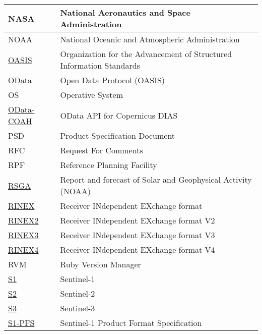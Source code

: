 \documentclass[dec_sum_main.tex]{subfiles}
\begin{document}
\begin{longtable}{|m{2.8cm}|m{10cm}|}
	NASA & National Aeronautics and Space Administration \\ \hline
	NOAA & National Oceanic and Atmospheric Administration \\ \hline
	\href{https://www.oasis-open.org/}{OASIS} & Organization for the Advancement of Structured Information Standards \\ \hline
	\href{https://www.odata.org/documentation/}{OData} & Open Data Protocol (OASIS) \\ \hline
	OS & Operative System \\ \hline
	\href{https://scihub.copernicus.eu/twiki/do/view/SciHubUserGuide/ODataAPI?redirectedfrom=SciHubUserGuide.7ODataAPI}{OData-COAH} & OData API for Copernicus DIAS \\ \hline
	PSD & Product Specification Document \\ \hline
	RFC & Request For Comments \\ \hline
	RPF & Reference Planning Facility \\ \hline
	\href{https://www.swpc.noaa.gov/products/solar-and-geophysical-activity-summary}{RSGA} & Report and forecast of Solar and Geophysical Activity  (NOAA)\\ \hline
	\href{https://www.igs.org/wg/rinex/#documents-formats}{RINEX} & Receiver INdependent EXchange format \\ \hline
	\href{https://files.igs.org/pub/data/format/rinex211.txt}{RINEX2} & Receiver INdependent EXchange format V2 \\ \hline
	\href{https://files.igs.org/pub/data/format/rinex305.pdf}{RINEX3} & Receiver INdependent EXchange format V3 \\ \hline
	\href{https://files.igs.org/pub/data/format/rinex_4.00.pdf}{RINEX4} & Receiver INdependent EXchange format V4 \\ \hline	
	RVM & Ruby Version Manager \\ \hline
	\href{https://sentinels.copernicus.eu/web/sentinel/missions/sentinel-1}{S1} & Sentinel-1 \\ \hline
	\href{https://sentinels.copernicus.eu/web/sentinel/missions/sentinel-2}{S2} & Sentinel-2 \\ \hline
	\href{https://sentinels.copernicus.eu/web/sentinel/missions/sentinel-3}{S3} & Sentinel-3 \\ \hline
	\href{https://sentinels.copernicus.eu/documents/247904/1877131/S1-RS-MDA-52-7441-3-9-2_Sentinel-1ProductSpecification.pdf/4f4488ef-60ad-52cb-160c-71ebdf6ca820?t=1641274625444}{S1-PFS} & Sentinel-1 Product Format Specification\\ \hline

\end{longtable}
\end{document}
